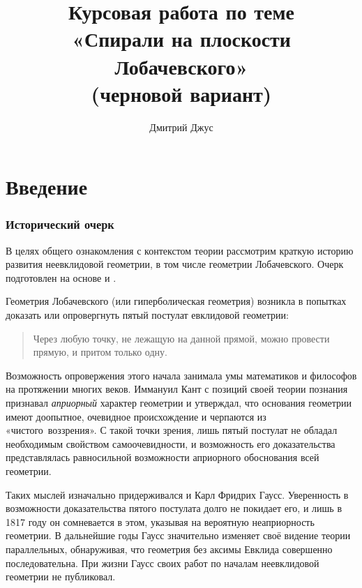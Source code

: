 \documentclass{article}
\numberwithin{equation}{section}
\begin{document}
\author{Дмитрий Джус}
\title{Курсовая работа по теме \\
  «Спирали на плоскости Лобачевского» \\
  (черновой вариант)}
\maketitle
\thispagestyle{empty}

\clearpage
\tableofcontents
\listoffigures

\clearpage

\part{Введение}

\section{Исторический очерк}
\label{sec:intro}

В целях общего ознакомления с контекстом теории рассмотрим краткую
историю развития неевклидовой геометрии, в том числе геометрии
Лобачевского. Очерк подготовлен на основе \cite{milnor82} и
\cite{norden56}.

Геометрия Лобачевского (или гиперболическая геометрия) возникла в
попытках доказать или опровергнуть пятый постулат евклидовой
геометрии:

\begin{quote}
  Через любую точку, не лежащую на данной прямой, можно провести
  прямую, и притом только одну.
\end{quote}

Возможность опровержения этого начала занимала умы математиков и
философов на протяжении многих веков. Иммануил Кант с позиций своей
теории познания признавал \emph{априорный} характер геометрии и
утверждал, что основания геометрии имеют доопытное, очевидное
происхождение и черпаются из «чистого воззрения». С такой точки
зрения, лишь пятый постулат не обладал необходимым свойством
самоочевидности, и возможность его доказательства представлялась
равносильной возможности априорного обоснования всей геометрии.

Таких мыслей изначально придерживался и Карл Фридрих Гаусс.
Уверенность в возможности доказательства пятого постулата долго не
покидает его, и лишь в 1817 году он сомневается в этом, указывая на
вероятную неаприорность геометрии. В дальнейшие годы Гаусс значительно
изменяет своё видение теории параллельных, обнаруживая, что геометрия
без аксимы Евклида совершенно последовательна. При жизни Гаусс своих
работ по началам неевклидовой геометрии не публиковал.
\end{document}
